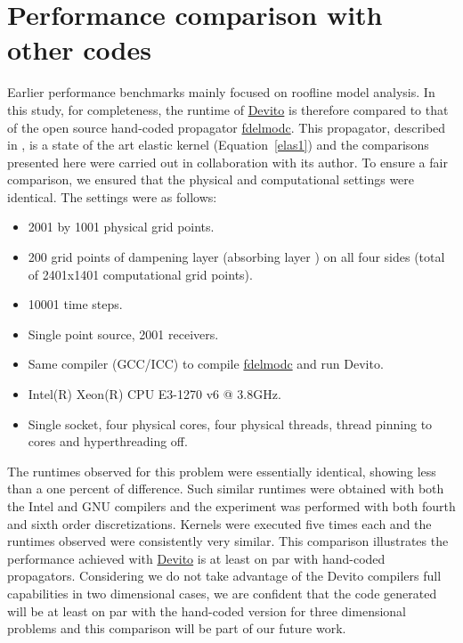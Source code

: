\documentclass[10pt, conference]{IEEEtran}
\newcommand{\devito}{\href{https://github.com/devitocodes/devito}{Devito} }
\begin{document}
\section{Performance comparison with other
codes}\label{performance-comparison-with-other-codes}

Earlier performance benchmarks mainly focused on roofline model analysis.
In this study, for completeness, the runtime of \devito is therefore
compared to that of the open source hand-coded propagator
\href{https://github.com/JanThorbecke/OpenSource.git}{fdelmodc}. This propagator,
described in \cite{thorbecke}, is a state of the art elastic kernel
(Equation~\ref{elas1}) and the comparisons presented here were carried out
in collaboration with its author. To ensure a fair
comparison, we ensured that the
physical and computational settings were identical. The settings were as
follows:

\begin{itemize}
\itemsep1pt\parskip0pt
\item
  2001 by 1001 physical grid points.
\item
  200 grid points of dampening layer (absorbing layer \cite{cerjan}) on
  all four sides (total of 2401x1401 computational grid points).
\item
  10001 time steps.
\item
  Single point source, 2001 receivers.
\item
  Same compiler (GCC/ICC) to compile
  \href{https://github.com/JanThorbecke/OpenSource.git}{fdelmodc} and
  run Devito.
\item
  Intel(R) Xeon(R) CPU E3-1270 v6 @ 3.8GHz.
\item
  Single socket, four physical cores, four physical threads, thread
  pinning to cores and hyperthreading off.
\end{itemize}

The runtimes observed for this problem were essentially identical,
showing less than a one percent of difference. Such similar runtimes were
obtained with both the Intel and GNU compilers and the
experiment was performed with both fourth and sixth order discretizations.
Kernels were executed five times each and the
runtimes observed were consistently very similar. This comparison
illustrates the performance achieved with \devito is at least on par with
hand-coded propagators. Considering we do not take advantage of the Devito
compilers full capabilities in two dimensional cases, we are confident
that the code generated will be at least on par with the hand-coded version
for three dimensional problems and this comparison will be part of our future
work.
\end{document}
